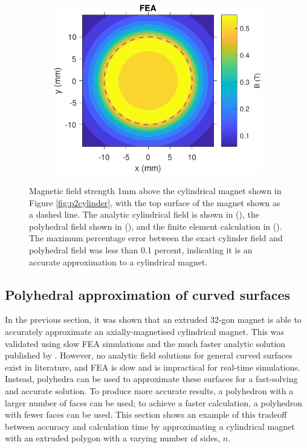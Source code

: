 \begin{figure}
	\vfill
	\begin{subfigure}{0.47\textwidth}
		\centering
		\includegraphics[width=\textwidth]{p2/p2FIG7c}
		\caption{}\label{fig:p2cylinderfieldc}
	\end{subfigure}
	\caption{Magnetic field strength 1\si{\milli\metre} above the cylindrical magnet shown in Figure \ref{fig:p2cylinder}, with the top surface of the magnet shown as a dashed line. The analytic cylindrical field \cite{Caciagli2018} is shown in (), the polyhedral field shown in (), and the finite element calculation in (). The maximum percentage error between the exact cylinder field \cite{Caciagli2018} and polyhedral field was less than 0.1 percent, indicating it is an accurate approximation to a cylindrical magnet.}
	\label{fig:p2cylinderfield}
\end{figure}

\subsection{Polyhedral approximation of curved surfaces}
In the previous section, it was shown that an extruded 32-gon magnet is able to accurately approximate an axially-magnetised cylindrical magnet. This was validated using slow FEA simulations and the much faster analytic solution published by \textcite{Caciagli2018}. However, no analytic field solutions for general curved surfaces exist in literature, and FEA is slow and is impractical for real-time simulations. Instead, polyhedra can be used to approximate these surfaces for a fast-solving and accurate solution. To produce more accurate results, a polyhedron with a larger number of faces can be used; to achieve a faster calculation, a polyhedron with fewer faces can be used. This section shows an example of this tradeoff between accuracy and calculation time by approximating a cylindrical magnet with an extruded polygon with a varying number of sides, \(n\).

